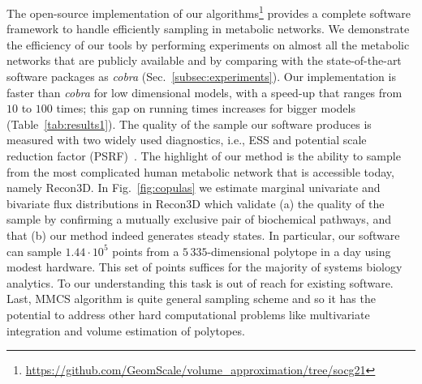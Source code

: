    The open-source implementation of our algorithms\footnote{\url{https://github.com/GeomScale/volume_approximation/tree/socg21}} provides a
   complete software framework to handle efficiently sampling in metabolic
   networks. We demonstrate the efficiency of our tools by performing experiments
   on almost all the metabolic networks that are publicly available and by
   comparing with the
   state-of-the-art software packages as \textit{cobra}
   (Sec.~\ref{subsec:experiments}). Our implementation is faster than \textit{cobra}
   for low dimensional models,  with a speed-up that ranges from $10$ to $100$ times;
   this gap on running times increases for bigger models
   (Table~\ref{tab:results1}). The quality of the sample our software produces is
   measured with two widely used diagnostics, i.e., ESS and potential scale reduction factor (PSRF)~\cite{Gelman92}. The highlight of
   our method is the ability to sample from the most complicated human metabolic
   network that is accessible today, namely Recon3D. In Fig.~\ref{fig:copulas} we estimate marginal univariate and bivariate flux distributions in Recon3D which validate
   (a) the  quality of the sample by confirming a mutually exclusive pair of biochemical pathways,
   and that (b) our method indeed generates steady states. In particular, our software
   can sample $1.44\cdot 10^5$ points from a $5\,335$-dimensional polytope in a day
   using modest hardware. This set of points suffices for the majority of systems
   biology analytics.
   To our understanding this task is out of reach for existing software.
   Last, MMCS algorithm is quite general sampling scheme and
   so it has the potential to address other
   hard computational problems like  multivariate integration and volume estimation of polytopes.







